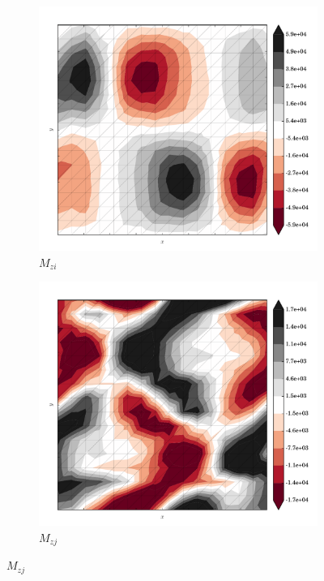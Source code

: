 \begin{figure}
  \begin{subfigure}[b]{0.3\linewidth}
    \includegraphics[width=\linewidth]{images/stress_balance/RS/M_zi.pdf}
  \caption{$M_{zi}$}
  \label{rs_M_zi}
  \end{subfigure}
  \begin{subfigure}[b]{0.3\linewidth}
    \includegraphics[width=\linewidth]{images/stress_balance/RS/M_zj.pdf}
  \caption{$M_{zj}$}
  \label{rs_M_zj}
  \end{subfigure}

\end{figure}
